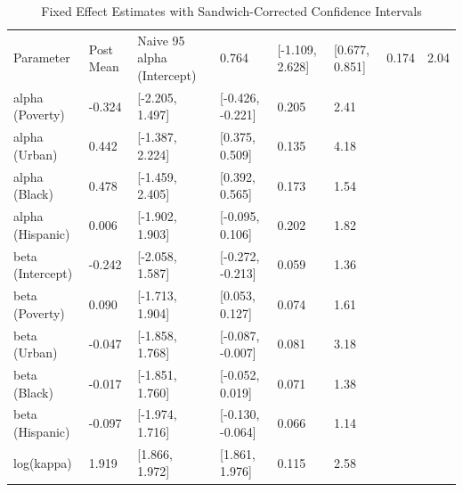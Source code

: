 \begin{table}[htbp]
\centering
\begin{tabular}{llllll}
  \toprule
Parameter & Post Mean & Naive 95%
  \midrule
alpha (Intercept) & 0.764 & [-1.109, 2.628] & [0.677, 0.851] & 0.174 & 2.04 \\ 
  alpha (Poverty) & -0.324 & [-2.205, 1.497] & [-0.426, -0.221] & 0.205 & 2.41 \\ 
  alpha (Urban) & 0.442 & [-1.387, 2.224] & [0.375, 0.509] & 0.135 & 4.18 \\ 
  alpha (Black) & 0.478 & [-1.459, 2.405] & [0.392, 0.565] & 0.173 & 1.54 \\ 
  alpha (Hispanic) & 0.006 & [-1.902, 1.903] & [-0.095, 0.106] & 0.202 & 1.82 \\ 
  beta (Intercept) & -0.242 & [-2.058, 1.587] & [-0.272, -0.213] & 0.059 & 1.36 \\ 
  beta (Poverty) & 0.090 & [-1.713, 1.904] & [0.053, 0.127] & 0.074 & 1.61 \\ 
  beta (Urban) & -0.047 & [-1.858, 1.768] & [-0.087, -0.007] & 0.081 & 3.18 \\ 
  beta (Black) & -0.017 & [-1.851, 1.760] & [-0.052, 0.019] & 0.071 & 1.38 \\ 
  beta (Hispanic) & -0.097 & [-1.974, 1.716] & [-0.130, -0.064] & 0.066 & 1.14 \\ 
  log(kappa) & 1.919 & [1.866, 1.972] & [1.861, 1.976] & 0.115 & 2.58 \\ 
   \bottomrule
\end{tabular}
\caption{Fixed Effect Estimates with Sandwich-Corrected Confidence Intervals} 
\end{table}
